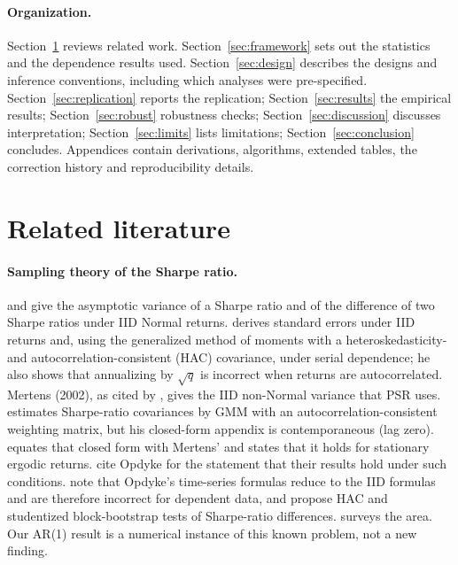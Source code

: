 \documentclass[11pt,a4paper]{article}
\theoremstyle{remark}
\begin{document}
\paragraph{Organization.} Section~\ref{sec:lit} reviews related work. Section~\ref{sec:framework} sets out the statistics and the dependence results used. Section~\ref{sec:design} describes the designs and inference conventions, including which analyses were pre-specified. Section~\ref{sec:replication} reports the replication; Section~\ref{sec:results} the empirical results; Section~\ref{sec:robust} robustness checks; Section~\ref{sec:discussion} discusses interpretation; Section~\ref{sec:limits} lists limitations; Section~\ref{sec:conclusion} concludes. Appendices contain derivations, algorithms, extended tables, the correction history and reproducibility details.

\section{Related literature}\label{sec:lit}

\paragraph{Sampling theory of the Sharpe ratio.} \citet{jobson1981} and \citet{memmel2003} give the asymptotic variance of a Sharpe ratio and of the difference of two Sharpe ratios under IID Normal returns. \citet{lo2002} derives standard errors under IID returns and, using the generalized method of moments with a heteroskedasticity- and autocorrelation-consistent (HAC) covariance, under serial dependence; he also shows that annualizing by $\sqrt{q}$ is incorrect when returns are autocorrelated. Mertens (2002), as cited by \citet{bailey2012frontier}, gives the IID non-Normal variance that PSR uses. \citet{christie2005} estimates Sharpe-ratio covariances by GMM with an autocorrelation-consistent weighting matrix, but his closed-form appendix is contemporaneous (lag zero). \citet{opdyke2007} equates that closed form with Mertens' and states that it holds for stationary ergodic returns. \citet[p.~4, p.~8]{bailey2012frontier} cite Opdyke for the statement that their results hold under such conditions. \citet[Remark~3.1]{ledoit2008} note that Opdyke's time-series formulas reduce to the IID formulas and are therefore incorrect for dependent data, and propose HAC and studentized block-bootstrap tests of Sharpe-ratio differences. \citet{pav2021} surveys the area. Our AR(1) result is a numerical instance of this known problem, not a new finding.
\end{document}
